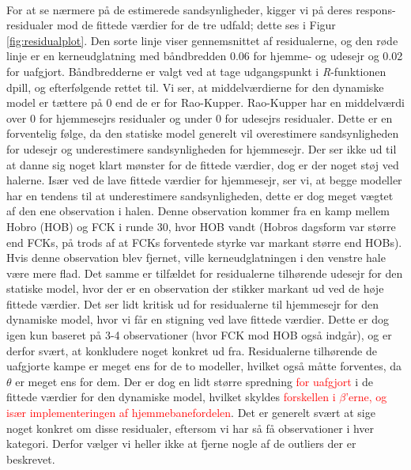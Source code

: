 \documentclass[11pt,a4paper]{article}
\begin{document}
 \\
 For at se nærmere på de estimerede sandsynligheder, kigger vi på deres respons-residualer mod de fittede værdier for de tre udfald; dette ses i Figur \ref{fig:residualplot}. Den sorte linje viser gennemsnittet af residualerne, og den røde linje er en kerneudglatning med båndbredden 0.06 for hjemme- og udesejr og 0.02 for uafgjort. Båndbredderne er valgt ved at tage udgangspunkt i \textit{R}-funktionen {\selectfont dpill}, og efterfølgende rettet til. Vi ser, at middelværdierne for den dynamiske model er tættere på 0 end de er for Rao-Kupper. Rao-Kupper har en middelværdi over 0 for hjemmesejrs residualer og under 0 for udesejrs residualer. Dette er en forventelig følge, da den statiske model generelt vil overestimere sandsynligheden for udesejr og underestimere sandsynligheden for hjemmesejr. Der ser ikke ud til at danne sig noget klart mønster for de fittede værdier, dog er der noget støj ved halerne. Især ved de lave fittede værdier for hjemmesejr, ser vi, at begge modeller har en tendens til at underestimere sandsynligheden, dette er dog meget vægtet af den ene observation i halen. Denne observation kommer fra en kamp mellem Hobro (HOB) og FCK i runde 30, hvor HOB vandt (Hobros dagsform var større end FCKs, på trods af at FCKs forventede styrke var markant større end HOBs). Hvis denne observation blev fjernet, ville kerneudglatningen i den venstre hale være mere flad. Det samme er tilfældet for residualerne tilhørende udesejr for den statiske model, hvor der er en observation der stikker markant ud ved de høje fittede værdier. Det ser lidt kritisk ud for residualerne til hjemmesejr for den dynamiske model, hvor vi får en stigning ved lave fittede værdier. Dette er dog igen kun baseret på 3-4 observationer (hvor FCK mod HOB også indgår), og er derfor svært, at konkludere noget konkret ud fra. Residualerne tilhørende de uafgjorte kampe er meget ens for de to modeller, hvilket også måtte forventes, da $\theta$ er meget ens for dem. Der er dog en lidt større spredning \textcolor{red}{for uafgjort} i de fittede værdier for den dynamiske model, hvilket skyldes \textcolor{red}{forskellen i $\beta$'erne, og især implementeringen af hjemmebanefordelen}. Det er generelt svært at sige noget konkret om disse residualer, eftersom vi har så få observationer i hver kategori. Derfor vælger vi heller ikke at fjerne nogle af de outliers der er beskrevet.
\end{document}
